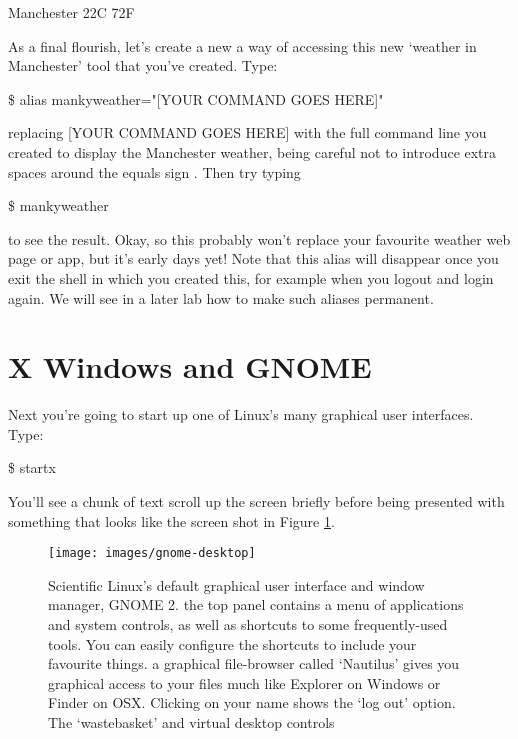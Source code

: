 \begin{ttoutenv}
   [33]Manchester 22\textdegree{}C 72\textdegree{}F
\end{ttoutenv}

As a final flourish, let's create a new a way of accessing this new `weather in Manchester' tool that you've created. Type:

\begin{ttoutenv}
\$ alias mankyweather="[YOUR COMMAND GOES HERE]"
\end{ttoutenv}

replacing [YOUR COMMAND GOES HERE] with the full command line you created to display the Manchester weather, being careful not to introduce extra spaces around the equals sign \ttout{=}. Then try typing

\begin{ttoutenv}
\$ mankyweather
\end{ttoutenv}


to see the result. Okay, so this probably won't replace your favourite weather web page or app, but it's early days yet! 
Note that this alias will disappear once you exit the shell in which you created this, for example when you logout and login again. We will see in a later lab how to make such aliases permanent.


\section{X Windows and GNOME} 

Next you're going to start up one of Linux's many graphical user interfaces. Type:

\begin{ttoutenv}
\$ startx
\end{ttoutenv}


You'll see a chunk of text scroll up the screen briefly before being presented with something that looks like the screen shot in Figure \ref{figure:gnome-desktop}.

\begin{figure}[t]
\centerline{\texttt{[image: images/gnome-desktop]}}
\caption{Scientific Linux's default graphical user interface and
  window manager, GNOME 2. \protect{} the top panel contains
  a menu of applications and system controls, as well as shortcuts to
  some frequently-used tools. You can easily configure the shortcuts
  to include your favourite things. \protect{} a graphical
  file-browser called `Nautilus' gives you graphical access to your
  files much like Explorer on Windows or Finder on
  OSX. \protect{} Clicking on your name shows the `log out'
  option. \protect{} The `wastebasket' and virtual desktop
  controls}\label{figure:gnome-desktop}
\end{figure}

